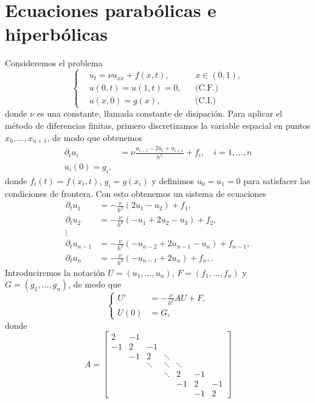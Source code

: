 \documentclass[11pt,letterpaper]{report}
\begin{document}
\chapter{Ecuaciones parabólicas e hiperbólicas}

Consideremos el problema
\begin{equation}
  \left\{
    \begin{aligned}
      & u_t = \nu u_{xx} + f(x,t), && x\in (0,1),
      \\
      & u(0,t) = u(1,t) = 0, && \text{(C.F.)}
      \\
      & u(x,0) = g(x), && \text{(C.I.)}
    \end{aligned}
  \right.
\end{equation}
donde $\nu$ es una constante, llamada constante de disipación.
Para aplicar el método de diferencias finitas, primero discretizamos
la variable espacial en puntos $x_0,\dots,x_{n+1}$, de modo
que obtenemos
\begin{align}
  \partial_t u_{i}
    &= \nu \frac{u_{i-1} -2u_{i} + u_{i+1}}{h^{2}} + f_i,
    \quad i=1,\dots,n
  \\
    u_i(0) = g_i
,\end{align}
donde $f_i(t)=f(x_i,t)$, $g_i=g(x_i)$ y definimos $u_0=u_1=0$ para
satisfacer las condiciones de frontera.
Con esto obtenemos un sistema de ecuaciones
\begin{align}
    \partial_t u_{1}
    &= -\frac{\nu }{h^{2}}(2u_{1} - u_{2}) + f_1,
  \\
    \partial_t u_{2}
    &= -\frac{\nu }{h^{2}}(-u_{1} +2u_{2} - u_{3}) + f_2,
  \\
    \vdots
  \\
    \partial_t u_{n-1}
    &= -\frac{\nu }{h^{2}}(-u_{n-2} +2u_{n-1} - u_{n}) + f_{n-1},
  \\
    \partial_t u_{n}
    &= -\frac{\nu }{h^{2}}(-u_{n-1} +2u_{n}) + f_n,
.\end{align}
Introduciremos la notación $U=(u_1,\dots,u_n)$, $F=(f_1,\dots,f_n)$ y
$G=(g_1,\dots,g_n)$, de modo que
\begin{equation}
  \left\{
    \begin{aligned}
      U' &= -\frac{\nu}{h^{2}}AU + F,
      \\
      U(0) &= G,
    \end{aligned}
  \right.
\end{equation}
donde
\begin{equation}
  A
  =
  \begin{bmatrix}
    2 & -1 \\
    -1 & 2 & -1 \\[-1mm]
       & -1 & 2 & \ddots \\[-1mm]
       & & \ddots & \ddots & \ddots \\[-1mm]
       & & & \ddots & 2 & -1 \\
       & & & & -1 & 2 & -1 \\
       & & & & & -1 & 2
  \end{bmatrix}
\end{equation}
\end{document}

